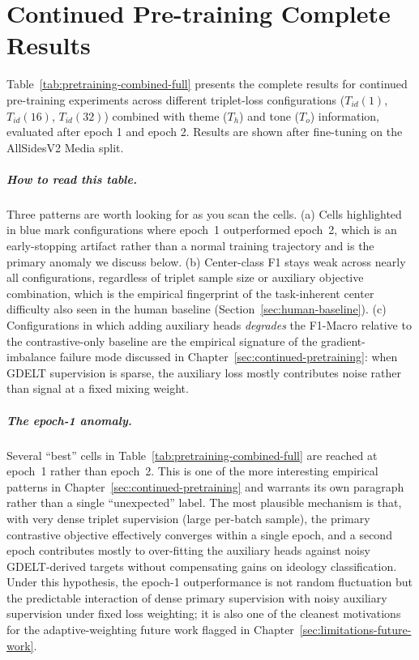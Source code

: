 \chapter{Continued Pre-training Complete Results}
\label{sec:appendix-full-experiments}

Table~\ref{tab:pretraining-combined-full} presents the complete results for continued pre-training experiments across different triplet-loss configurations ($T_{id}(1)$, $T_{id}(16)$, $T_{id}(32)$) combined with theme ($T_h$) and tone ($T_o$) information, evaluated after epoch 1 and epoch 2. Results are shown after fine-tuning on the AllSidesV2 Media split.

\paragraph{How to read this table.} Three patterns are worth looking for as you scan the cells. (a) Cells highlighted in blue mark configurations where epoch~1 outperformed epoch~2, which is an early-stopping artifact rather than a normal training trajectory and is the primary anomaly we discuss below. (b) Center-class F1 stays weak across nearly all configurations, regardless of triplet sample size or auxiliary objective combination, which is the empirical fingerprint of the task-inherent center difficulty also seen in the human baseline (Section~\ref{sec:human-baseline}). (c) Configurations in which adding auxiliary heads \emph{degrades} the F1-Macro relative to the contrastive-only baseline are the empirical signature of the gradient-imbalance failure mode discussed in Chapter~\ref{sec:continued-pretraining}: when GDELT supervision is sparse, the auxiliary loss mostly contributes noise rather than signal at a fixed mixing weight.

\paragraph{The epoch-1 anomaly.} Several ``best'' cells in Table~\ref{tab:pretraining-combined-full} are reached at epoch~1 rather than epoch~2. This is one of the more interesting empirical patterns in Chapter~\ref{sec:continued-pretraining} and warrants its own paragraph rather than a single ``unexpected'' label. The most plausible mechanism is that, with very dense triplet supervision (large per-batch sample), the primary contrastive objective effectively converges within a single epoch, and a second epoch contributes mostly to over-fitting the auxiliary heads against noisy GDELT-derived targets without compensating gains on ideology classification. Under this hypothesis, the epoch-1 outperformance is not random fluctuation but the predictable interaction of dense primary supervision with noisy auxiliary supervision under fixed loss weighting; it is also one of the cleanest motivations for the adaptive-weighting future work flagged in Chapter~\ref{sec:limitations-future-work}.

